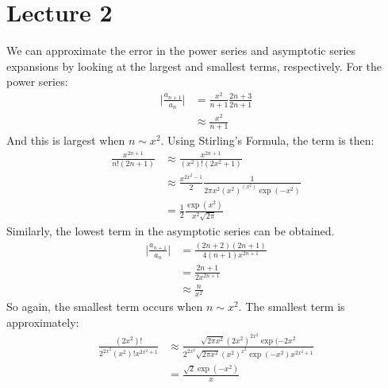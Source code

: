 \documentclass[crop=false,class=book,oneside]{standalone}
\begin{document}
    \section{Lecture 2}
        We can approximate the error in the power series and
        asymptotic series expansions by looking at the largest
        and smallest terms, respectively. For the power series:
        \begin{align}
            \Big|\frac{a_{n+1}}{a_{n}}\Big|
            &=\frac{x^{2}}{n+1}\frac{2n+3}{2n+1}\\
            &\approx\frac{x^{2}}{n+1}
        \end{align}
        And this is largest when $n\sim{x}^{2}$.
        Using Stirling's Formula, the term is then:
        \begin{align}
            \frac{x^{2n+1}}{n!(2n+1)}
            &\approx\frac{x^{2n+1}}{(x^{2})!(2x^{2}+1)}\\
            &\approx\frac{x^{2x^{2}-1}}{2}
            \frac{1}{2\pi{x}^{2}(x^{2})^{(x^{2})}\exp(-x^{2})}\\
            &=\frac{1}{2}\frac{\exp(x^{2})}{x^{2}\sqrt{2\pi}}
        \end{align}
        Similarly, the lowest term in the asymptotic series
        can be obtained.
        \begin{align}
            \Big|\frac{a_{n+1}}{a_{n}}\Big|
            &=\frac{(2n+2)(2n+1)}{4(n+1)x^{2n+1}}\\
            &=\frac{2n+1}{2x^{2n+1}}\\
            &\approx\frac{n}{x^{2}}
        \end{align}
        So again, the smallest term occurs when
        $n\sim{x}^{2}$. The smallest term is approximately:
        \begin{align}
            \frac{(2x^{2})!}{2^{2x^{2}}(x^{2})!x^{2x^{2}+1}}
            &\approx
            \frac{\sqrt{2\pi{x}^{2}}(2x^{2})^{2x^{2}}\exp(-2x^{2}}
                 {2^{2x^{2}}\sqrt{2\pi{x}^{2}}(x^{2})^{x^{2}}
                  \exp(-x^{2})x^{2x^{2}+1}}\\
            &=\frac{\sqrt{2}\exp(-x^{2})}{x}
        \end{align}
\end{document}
